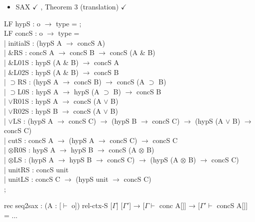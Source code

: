 \documentclass[9ps]{beamer}
\begin{document}
\begin{frame}

\begin{itemize}
      \item SAX $\checkmark$ , Theorem 3 (translation) $\checkmark$
\end{itemize}

  \scriptsize
\ttfamily

LF hypS : o $\to$ type = ;\\
LF concS : o $\to$ type =\\[4pt]

\quad | initialS : (hypS A $\to$ concS A)\\
\quad | \&RS : concS A $\to$ concS B $\to$ concS (A \& B)\\
\quad | \&L01S : hypS (A \& B) $\to$ concS A\\
\quad | \&L02S : hypS (A \& B) $\to$ concS B\\
\quad | $\supset$RS : (hypS A $\to$ concS B) $\to$ concS (A $\supset$ B)\\
\quad | $\supset$L0S : hypS A $\to$ hypS (A $\supset$ B) $\to$ concS B\\
\quad | $\vee$R01S : hypS A $\to$ concS (A $\vee$ B)\\
\quad | $\vee$R02S : hypS B $\to$ concS (A $\vee$ B)\\
\quad | $\vee$LS : (hypS A $\to$ concS C) $\to$ (hypS B $\to$ concS C) $\to$ (hypS (A $\vee$ B) $\to$ concS C)\\
\quad | cutS : concS A $\to$ (hypS A $\to$ concS C) $\to$ concS C\\
\quad | $\otimes$R0S : hypS A $\to$ hypS B $\to$ concS (A $\otimes$ B)\\
\quad | $\otimes$LS : (hypS A $\to$ hypS B $\to$ concS C) $\to$ (hypS (A $\otimes$ B) $\to$ concS C)\\
\quad | unitRS : concS unit\\
\quad | unitLS : concS C $\to$ (hypS unit $\to$ concS C)\\
;

rec seq2sax : (A : [$\vdash$ o]) rel-ctx-S [$\Gamma$] [$\Gamma'$]
              → [$\Gamma \vdash$ conc A[]] → [$\Gamma' \vdash$ concS A[]] = ...
\end{frame}
\end{document}
